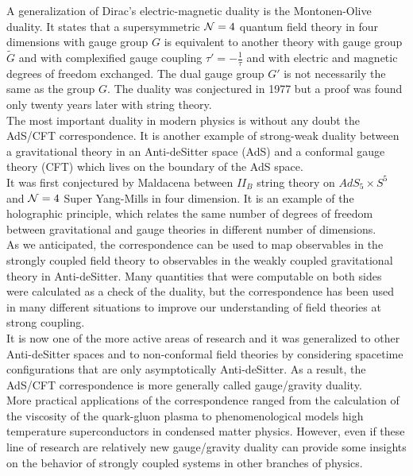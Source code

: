 A generalization of Dirac's electric-magnetic duality is the Montonen-Olive duality.
It states that a supersymmetric  $\mathcal{N}=4$ quantum field theory in four dimensions with gauge group $G$ is equivalent to another theory with gauge group $\tilde{G}$ and with complexified gauge coupling $\tau' = - \frac{1}{\tau}$ and with electric and magnetic degrees of freedom exchanged.
The dual gauge group $G'$ is not necessarily the same as the group $G$.
The duality was conjectured in 1977 but a proof was found only twenty years later with string theory.\\

The most important duality in modern physics is without any doubt the AdS/CFT correspondence. 
It is another example of strong-weak duality between a gravitational theory in an Anti-deSitter space (AdS) and a conformal gauge theory (CFT) which lives on the boundary of the AdS space. \\
It was first conjectured by Maldacena between $II_B$ string theory on $AdS_5 \times S^5$ and $\mathcal{N}=4$ Super Yang-Mills in four dimension. 
It is an example of the holographic principle, which relates the same number of degrees of freedom between gravitational and gauge theories in different number of dimensions.\\
As we anticipated, the correspondence can be used to map observables in the strongly coupled field theory to observables in the weakly coupled gravitational theory in Anti-deSitter.
Many quantities that were computable on both sides were calculated as a check of the duality, but the correspondence has been used in many different situations to improve our understanding of field theories at strong coupling.\\
It is now one of the more active areas of research and it was generalized to other Anti-deSitter spaces and to non-conformal field theories by considering spacetime configurations that are only asymptotically Anti-deSitter.
As a result, the AdS/CFT correspondence is more generally called gauge/gravity duality.  \\
More practical applications of the correspondence ranged from the calculation of the viscosity of the quark-gluon plasma to phenomenological models high temperature superconductors in condensed matter physics.
However, even if these line of research are relatively new gauge/gravity duality can provide some insights on the behavior of strongly coupled systems in other branches of physics.   
\\ 

